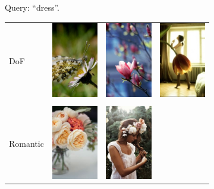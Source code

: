 \begin{figure}
\begin{subfigure}[t]{0.48\linewidth}
    \caption{Query: ``dress''.}
\end{subfigure}\hfill\begin{subfigure}[t]{0.48\linewidth}
    \begin{tabular}{m{.05in}|m{\dgap} m{\dgap} m{\dgap}}
    \begin{turn}{90}\small{DoF}\end{turn} &
    \includegraphics[width=.8in]{../style/figures/flickr_on_pinterest/flower/pred_style_Depth_of_Field/h/1.jpg} &
    \includegraphics[width=.8in]{../style/figures/flickr_on_pinterest/flower/pred_style_Depth_of_Field/h/3.jpg} &
    \includegraphics[width=.8in]{../style/figures/flickr_on_pinterest/flower/pred_style_Depth_of_Field/h/4.jpg} \\ \\
    \begin{turn}{90}\small{Romantic}\end{turn} &
    \includegraphics[width=.8in]{../style/figures/flickr_on_pinterest/flower/pred_style_Romantic/h/0.jpg} &
    \includegraphics[width=.8in]{../style/figures/flickr_on_pinterest/flower/pred_style_Romantic/h/1.jpg} &

\end{tabular}
\end{subfigure}
\end{figure}
